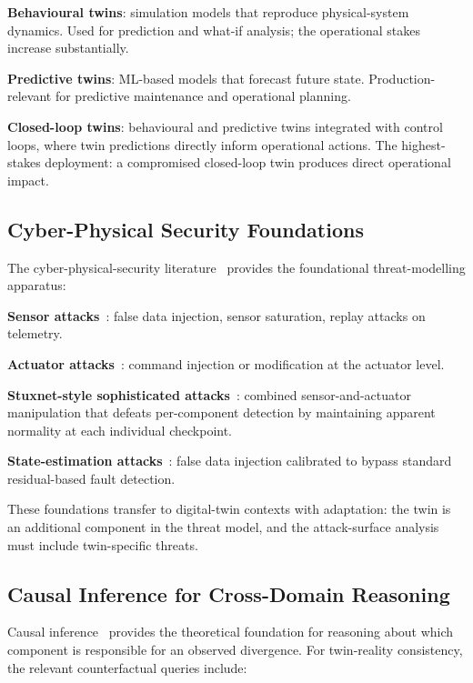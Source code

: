 \documentclass[sigconf,nonacm]{acmart}
\begin{document}
\textbf{Behavioural twins}: simulation models that reproduce
physical-system dynamics. Used for prediction and what-if
analysis; the operational stakes increase substantially.

\textbf{Predictive twins}: ML-based models that forecast future
state. Production-relevant for predictive maintenance and
operational planning.

\textbf{Closed-loop twins}: behavioural and predictive twins
integrated with control loops, where twin predictions directly
inform operational actions. The highest-stakes deployment: a
compromised closed-loop twin produces direct operational impact.

\subsection{Cyber-Physical Security Foundations}

The cyber-physical-security literature~\cite{cardenas2024cpssec,
humayed2024cpssurv} provides the foundational threat-modelling
apparatus:

\textbf{Sensor attacks}~\cite{shoukry2024sensoratk}: false data
injection, sensor saturation, replay attacks on telemetry.

\textbf{Actuator attacks}~\cite{teixeira2015cpsattack}: command
injection or modification at the actuator level.

\textbf{Stuxnet-style sophisticated attacks}~\cite{langner2013stuxnet}:
combined sensor-and-actuator manipulation that defeats per-component
detection by maintaining apparent normality at each individual
checkpoint.

\textbf{State-estimation attacks}~\cite{liu2011fdi}: false data
injection calibrated to bypass standard residual-based fault
detection.

These foundations transfer to digital-twin contexts with
adaptation: the twin is an additional component in the threat
model, and the attack-surface analysis must include twin-specific
threats.

\subsection{Causal Inference for Cross-Domain Reasoning}

Causal inference~\cite{pearl2009causality,peters2017elements}
provides the theoretical foundation for reasoning about which
component is responsible for an observed divergence. For
twin-reality consistency, the relevant counterfactual queries
include:
\end{document}
